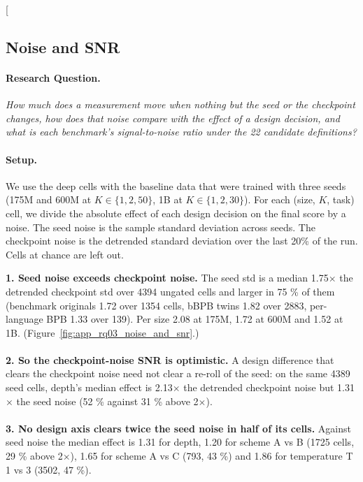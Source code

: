 \clearpage
\twocolumn[{%
\subsection{Noise and SNR}
\label{app:rq03_noise_and_snr}

\noindent\begin{minipage}[t]{0.485\textwidth}
\vspace{0pt}
\paragraph{Research Question.} \emph{How much does a measurement move when nothing but the seed or the checkpoint changes, how does that noise compare with the effect of a design decision, and what is each benchmark's signal-to-noise ratio under the 22 candidate definitions?}

\paragraph{Setup.} We use the deep cells with the baseline data that were trained with three seeds (175M and 600M at $K \in \{1, 2, 50\}$, 1B at $K \in \{1, 2, 30\}$). For each (size, $K$, task) cell, we divide the absolute effect of each design decision on the final score by a noise. The seed noise is the sample standard deviation across seeds. The checkpoint noise is the detrended standard deviation over the last 20\% of the run. Cells at chance are left out.
\end{minipage}\hfill
\begin{minipage}[t]{0.485\textwidth}
\vspace{0pt}
\begin{rqfinding}
\textbf{1. Seed noise exceeds checkpoint noise.} The seed std is a median 1.75$\times$ the detrended checkpoint std over 4394 ungated cells and larger in 75 \% of them (benchmark originals 1.72 over 1354 cells, bBPB twins 1.82 over 2883, per-language BPB 1.33 over 139). Per size 2.08 at 175M, 1.72 at 600M and 1.52 at 1B. (Figure~\ref{fig:app_rq03_noise_and_snr}.)
\\
\\
\textbf{2. So the checkpoint-noise SNR is optimistic.} A design difference that clears the checkpoint noise need not clear a re-roll of the seed: on the same 4389 seed cells, depth's median effect is 2.13$\times$ the detrended checkpoint noise but 1.31$\times$ the seed noise (52 \% against 31 \% above 2$\times$).
\\
\\
\textbf{3. No design axis clears twice the seed noise in half of its cells.} Against seed noise the median effect is 1.31 for depth, 1.20 for scheme A vs B (1725 cells, 29 \% above 2$\times$), 1.65 for scheme A vs C (793, 43 \%) and 1.86 for temperature T 1 vs 3 (3502, 47 \%).
\end{rqfinding}
\end{minipage}

}
